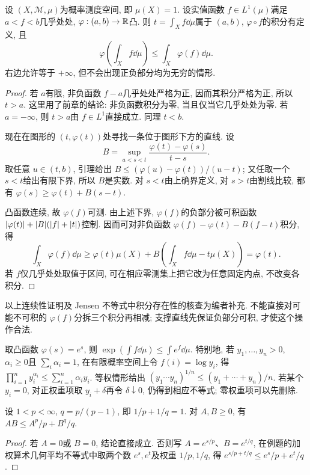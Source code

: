 \begin{theorem}[Jensen不等式]\label{ra:c5:jensen}
设 $(X,\mathcal M,\mu)$为概率测度空间, 即 $\mu(X)=1$. 设实值函数 $f\in L^1(\mu)$满足 $a<f<b$几乎处处, $\varphi:(a,b)\to\mathbb R$凸. 则 $t=\int_X f\dd\mu$属于 $(a,b)$, $\varphi\circ f$的积分有定义, 且
\[
 \varphi\left(\int_X f\dd\mu\right)
 \le \int_X\varphi(f)\dd\mu.
\]
右边允许等于 $+\infty$, 但不会出现正负部分均为无穷的情形.
\end{theorem}
\begin{proof}
若 $a$有限, 非负函数 $f-a$几乎处处严格为正, 因而其积分严格为正, 所以 $t>a$. 这里用了前章的结论: 非负函数积分为零, 当且仅当它几乎处处为零. 若 $a=-\infty$, 则 $t>a$由 $f\in L^1$直接成立. 同理 $t<b$.

现在在图形的 $(t,\varphi(t))$处寻找一条位于图形下方的直线. 设
\[
 B=\sup_{a<s<t}\frac{\varphi(t)-\varphi(s)}{t-s}.
\]
取任意 $u\in(t,b)$, 引理给出 $B\le(\varphi(u)-\varphi(t))/(u-t)$; 又任取一个 $s<t$给出有限下界, 所以 $B$是实数. 对 $s<t$由上确界定义, 对 $s>t$由割线比较, 都有 $\varphi(s)\ge\varphi(t)+B(s-t)$.

凸函数连续, 故 $\varphi(f)$可测. 由上述下界, $\varphi(f)$的负部分被可积函数 $\lvert \varphi(t)\rvert+\lvert B\rvert(\lvert f\rvert+\lvert t\rvert)$控制. 因而可对非负函数 $\varphi(f)-\varphi(t)-B(f-t)$积分, 得
\[
 \int_X\varphi(f)\dd\mu
 \ge\varphi(t)\mu(X)+B\left(\int_X f\dd\mu-t\mu(X)\right)
 =\varphi(t).
\]
若 $f$仅几乎处处取值于区间, 可在相应零测集上把它改为任意固定内点, 不改变各积分.
\end{proof}

\begin{remark}
以上连续性证明及 Jensen 不等式中积分存在性的核查为编者补充. 不能直接对可能不可积的 $\varphi(f)$分拆三个积分再相减; 支撑直线先保证负部分可积, 才使这个操作合法.
\end{remark}

\begin{example}\label{ra:c5:amgm}
取凸函数 $\varphi(s)=e^s$, 则 $\exp(\int f\dd\mu)\le\int e^f\dd\mu$. 特别地, 若 $y_1,\ldots,y_n>0$, $\alpha_i\ge0$且 $\sum_i\alpha_i=1$, 在有限概率空间上令 $f(i)=\log y_i$, 得 $\prod_{i=1}^n y_i^{\alpha_i}\le\sum_{i=1}^n\alpha_i y_i$.
等权情形给出 $(y_1\cdots y_n)^{1/n}\le(y_1+\cdots+y_n)/n$. 若某个 $y_i=0$, 对正权重项取 $y_i+\delta$再令 $\delta\downarrow0$, 仍得到相应不等式; 零权重项可以先删除.
\end{example}

\begin{lemma}[Young不等式]\label{ra:c5:young}
设 $1<p<\infty$, $q=p/(p-1)$, 即 $1/p+1/q=1$. 对 $A,B\ge0$, 有 $AB\le A^p/p+B^q/q$.
\end{lemma}
\begin{proof}
若 $A=0$或 $B=0$, 结论直接成立. 否则写 $A=e^{s/p}$、$B=e^{t/q}$, 在例题的加权算术几何平均不等式中取两个数 $e^s,e^t$及权重 $1/p,1/q$, 得 $e^{s/p+t/q}\le e^s/p+e^t/q$.
\end{proof}

